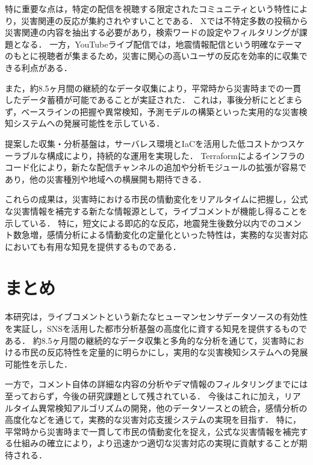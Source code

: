 特に重要な点は，特定の配信を視聴する限定されたコミュニティという特性により，災害関連の反応が集約されやすいことである．
Xでは不特定多数の投稿から災害関連の内容を抽出する必要があり，検索ワードの設定やフィルタリングが課題となる．
一方，YouTubeライブ配信では，地震情報配信という明確なテーマのもとに視聴者が集まるため，災害に関心の高いユーザの反応を効率的に収集できる利点がある．

また，約8.5ヶ月間の継続的なデータ収集により，平常時から災害時までの一貫したデータ蓄積が可能であることが実証された．
これは，事後分析にとどまらず，ベースラインの把握や異常検知，予測モデルの構築といった実用的な災害検知システムへの発展可能性を示している．

提案した収集・分析基盤は，サーバレス環境とIaCを活用した低コストかつスケーラブルな構成により，持続的な運用を実現した．
Terraformによるインフラのコード化により，新たな配信チャンネルの追加や分析モジュールの拡張が容易であり，他の災害種別や地域への横展開も期待できる．

これらの成果は，災害時における市民の情動変化をリアルタイムに把握し，公式な災害情報を補完する新たな情報源として，ライブコメントが機能し得ることを示している．
特に，短文による即応的な反応，地震発生後数分以内でのコメント数急増，感情分析による情動変化の定量化といった特性は，実務的な災害対応においても有用な知見を提供するものである．


\section{まとめ}

本研究は，ライブコメントという新たなヒューマンセンサデータソースの有効性を実証し，SNSを活用した都市分析基盤の高度化に資する知見を提供するものである．
約8.5ヶ月間の継続的なデータ収集と多角的な分析を通じて，災害時における市民の反応特性を定量的に明らかにし，実用的な災害検知システムへの発展可能性を示した．

一方で，コメント自体の詳細な内容の分析やデマ情報のフィルタリングまでには至っておらず，今後の研究課題として残されている．
今後はこれに加え，リアルタイム異常検知アルゴリズムの開発，他のデータソースとの統合，感情分析の高度化などを通じて，実務的な災害対応支援システムの実現を目指す．
特に，平常時から災害時まで一貫して市民の情動変化を捉え，公式な災害情報を補完する仕組みの確立により，より迅速かつ適切な災害対応の実現に貢献することが期待される．    